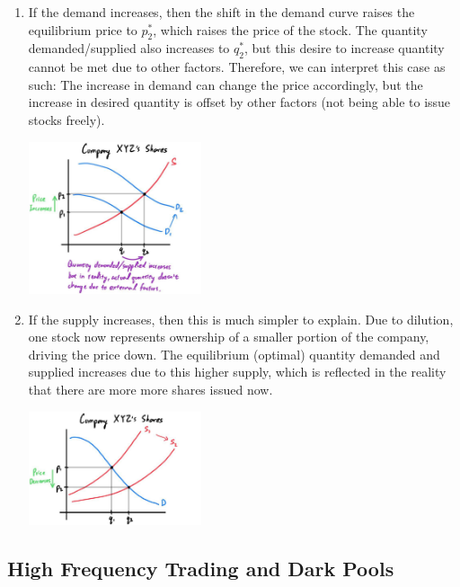 \documentclass{article}
\begin{document}
    \begin{enumerate}
      \item If the demand increases, then the shift in the demand curve raises the equilibrium price to $p_2^*$, which raises the price of the stock. The quantity demanded/supplied also increases to $q_2^*$, but this desire to increase quantity cannot be met due to other factors. Therefore, we can interpret this case as such: The increase in demand can change the price accordingly, but the increase in desired quantity is offset by other factors (not being able to issue stocks freely). 
      \begin{center}
        \includegraphics[width=0.4\textwidth]{img/Stock_Demand_Increase.jpg}
      \end{center}

      \item If the supply increases, then this is much simpler to explain. Due to dilution, one stock now represents ownership of a smaller portion of the company, driving the price down. The equilibrium (optimal) quantity demanded and supplied increases due to this higher supply, which is reflected in the reality that there are more more shares issued now. 
      \begin{center}
        \includegraphics[width=0.4\textwidth]{img/Stock_Supply_Increase.jpg}
      \end{center}
    \end{enumerate}

  \subsection{High Frequency Trading and Dark Pools}
\end{document}
